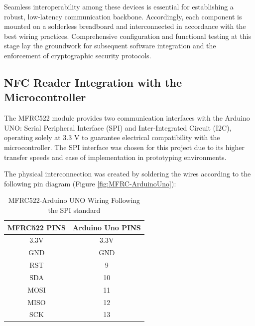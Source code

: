 Seamless interoperability among these devices is essential for establishing a robust, low-latency communication backbone. Accordingly, each component is mounted on a solderless breadboard and interconnected in accordance with the best wiring practices. Comprehensive configuration and functional testing at this stage lay the groundwork for subsequent software integration and the enforcement of cryptographic security protocols.

\subsection{NFC Reader Integration with the Microcontroller}

The MFRC522 module provides two communication interfaces with the Arduino UNO: Serial Peripheral Interface (SPI) and Inter-Integrated Circuit (I2C), operating solely at 3.3 V to guarantee electrical compatibility with the microcontroller. The SPI interface was chosen for this project due to its higher transfer speeds and ease of implementation in prototyping environments.

The physical interconnection was created by soldering the wires according to the following pin diagram (Figure \ref{fig:MFRC-ArduinoUno}):

\begin{table}[H]
	\centering
	\begin{tabular}{|c|c|}
		\hline
		\textbf{MFRC522 PINS} & \textbf{Arduino Uno PINS} \\
		\hline
		3.3V & 3.3V \\
		GND & GND \\
		RST & 9 \\
		SDA & 10 \\
		MOSI & 11 \\
		MISO & 12 \\
		SCK & 13 \\
		\hline
	\end{tabular}
	\caption{MFRC522-Arduino UNO Wiring Following the SPI standard}
	\label{tab:mfrc522_arduino}
\end{table}

